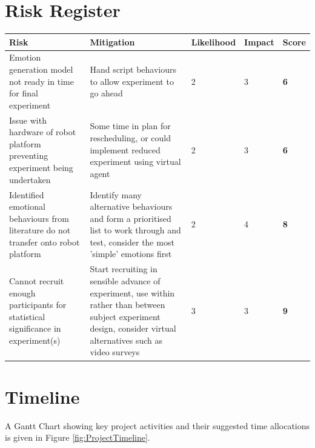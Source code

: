 \documentclass[11pt]{article}
\begin{document}
\section{Risk Register}
\begin{center}
	\begin{tabular}{|m{6cm}|m{5cm}|m{1.8cm}|m{1cm}|m{1cm}|}
		\hline
		Risk & Mitigation & Likelihood & Impact & \textbf{Score} \\
		\hline
		Emotion generation model not ready in time for final experiment & Hand script behaviours to allow experiment to go ahead & 2 & 3 & \textbf{6} \\ 
		\hline 
		Issue with hardware of robot platform preventing experiment being undertaken & Some time in plan for rescheduling, or could implement reduced experiment using virtual agent & 2 & 3 & \textbf{6} \\
		\hline
		Identified emotional behaviours from literature do not transfer onto robot platform & Identify many alternative behaviours and form a prioritised list to work through and test, consider the most 'simple' emotions first & 2 & 4 & \textbf{8} \\ 
		\hline 
		Cannot recruit enough participants for statistical significance in experiment(s) & Start recruiting in sensible advance of experiment, use within rather than between subject experiment design, consider virtual alternatives such as video surveys & 3 & 3 & \textbf{9} \\
		\hline
	\end{tabular} 
\end{center}

\section{Timeline}
A Gantt Chart showing key project activities and their suggested time allocations is given in Figure \ref{fig:ProjectTimeline}. 
\end{document}
